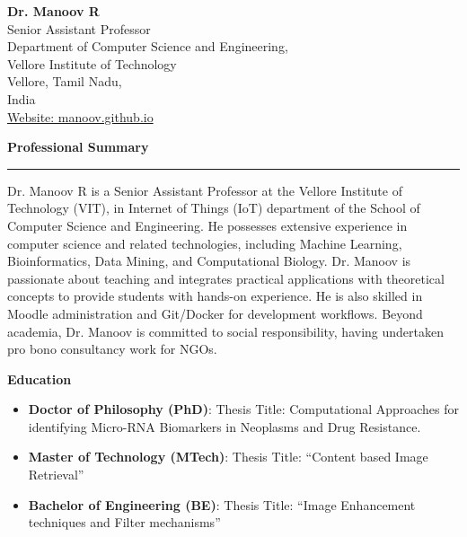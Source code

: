 \documentclass[a4paper,10pt]{article}
\newcommand{\sectiontitle}[1]{\vspace{1em}\textbf{\Large #1}\vspace{0.5em}\\\hrule\vspace{1em}}
\newcommand{\cvsection}[1]{%
    \vspace{2mm}
    \begin{tcolorbox}
        \textbf{\large #1}
    \end{tcolorbox}
    \vspace{-4mm}
}
\newcommand{\headerfontiii}{\fontfamily{ppl}\selectfont} %
\begin{document}
\headerfontiii
\begin{center}
    {\Large \textbf{Dr. Manoov R}}\\
    Senior Assistant Professor\\
    Department of Computer Science and Engineering,\\ Vellore Institute of Technology\\
    Vellore, Tamil Nadu, \\India \\
    \href{https://manoov.github.io}{Website: manoov.github.io}
\end{center}

\sectiontitle{Professional Summary}
Dr. Manoov R is a Senior Assistant Professor at the Vellore Institute of Technology (VIT), in Internet of Things (IoT) department of the School of Computer Science and Engineering. He possesses extensive experience in computer science and related technologies, including Machine Learning, Bioinformatics, Data Mining, and Computational Biology. Dr. Manoov is passionate about teaching and integrates practical applications with theoretical concepts to provide students with hands-on experience. He is also skilled in Moodle administration and Git/Docker for development workflows. Beyond academia, Dr. Manoov is committed to social responsibility, having undertaken pro bono consultancy work for NGOs.

\cvsection{Education}
\begin{itemize}[leftmargin=*]
    \item \textbf{Doctor of Philosophy (PhD)}: Thesis Title: Computational Approaches for identifying Micro-RNA Biomarkers in Neoplasms and Drug Resistance.
    \item \textbf{Master of Technology (MTech)}: Thesis Title: “Content based Image Retrieval”
    \item \textbf{Bachelor of Engineering (BE)}: Thesis Title: “Image Enhancement techniques and Filter mechanisms”
\end{itemize}
\end{document}
